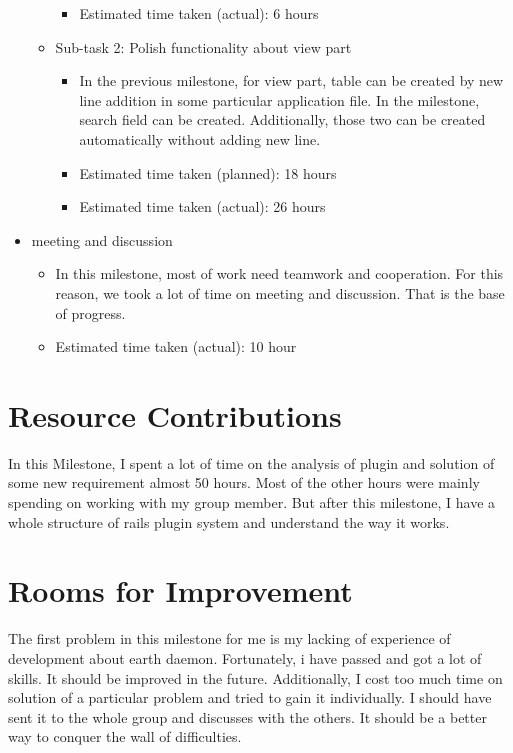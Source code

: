 \documentclass{article}
\begin{document}
\begin{itemize}
\begin{itemize}
\begin{itemize}
                    \item Estimated time taken (actual): 6 hours
                \end{itemize}
            \item Sub-task 2: Polish functionality about view part
                \begin{itemize}
                    \item In the previous milestone, for view part, table can be created by new line addition in some particular application file. In the milestone, search field can be created. Additionally, those two can be created automatically without adding new line.		
                    \item Estimated time taken (planned): 18 hours
                    \item Estimated time taken (actual): 26 hours
                \end{itemize}
        \end{itemize}
    \item meeting and discussion
        \begin{itemize}
            \item In this milestone, most of work need teamwork and cooperation. For this reason, we took a lot of time on meeting and discussion. That is the base of progress.
            \item Estimated time taken (actual): 10 hour
        \end{itemize}
\end{itemize}

\section*{Resource Contributions}

In this Milestone, I spent a lot of time on the analysis of plugin and solution of some new requirement almost 50 hours. Most of the other hours were mainly spending on working with my group member. But after this milestone, I have a whole structure of rails plugin system and understand the way it works.

\section*{Rooms for Improvement}


The first problem in this milestone for me is my lacking of experience of development about earth daemon. Fortunately, i have passed and got a lot of skills. It should be improved in the future. Additionally, I cost too much time on solution of a particular problem and tried to gain it individually. I should have sent it to the whole group and discusses with the others. It should be a better way to conquer the wall of difficulties.
\end{document}
